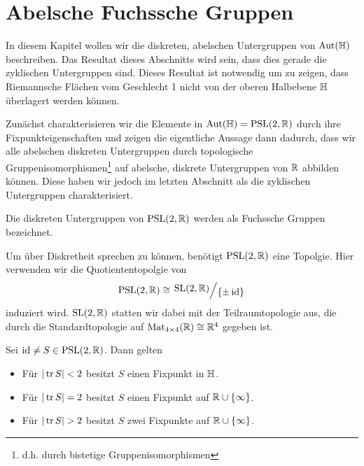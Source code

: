 
\section{Abelsche Fuchssche Gruppen}
\label{sec:fuchs}

In diesem Kapitel wollen wir die diskreten, abelschen Untergruppen von
$\operatorname{Aut}(\mathbb{H})$ beschreiben. Das Resultat dieses Abschnitts wird sein, dass
dies gerade die zyklischen Untergruppen sind. Dieses Resultat ist
notwendig um zu zeigen, dass Riemannsche Flächen vom Geschlecht 1
nicht von der oberen Halbebene $\mathbb{H}$ überlagert werden können.

Zunächst charakterisieren wir die Elemente in $\operatorname{Aut}(\mathbb{H}) = \operatorname{PSL}(2, \mathbb{R})$
durch ihre Fixpunkteigenschaften und zeigen die eigentliche Aussage
dann dadurch, dass wir alle abelschen diskreten Untergruppen durch
topologische Gruppenisomorphismen\footnote{d.h. durch bistetige
  Gruppenisomorphismen} auf abelsche, diskrete Untergruppen
von $\mathbb{R}$ abbilden können. Diese haben wir jedoch im letzten Abschnitt
als die zyklischen Untergruppen charakterisiert.

\begin{defin}
  Die diskreten Untergruppen von $\operatorname{PSL}(2,\mathbb{R})$ werden als Fuchssche
  Gruppen bezeichnet.
\end{defin}

\begin{rem}
  Um über Diskretheit sprechen zu können, benötigt $\operatorname{PSL}(2, \mathbb{R})$
  eine Topolgie. Hier verwenden wir die Quotiententopolgie von
  \[
  \PSL(2, \R) \cong \quot{\SL(2, \R)}{\{\pm \id\}}
  \]
  induziert wird. $\operatorname{SL}(2, \mathbb{R})$ statten wir dabei mit der
  Teilraumtopologie aus, die durch die Standardtopologie auf
  $\operatorname{Mat}_{4\times4}(\mathbb{R}) \cong \mathbb{R}^4$ gegeben ist.
\end{rem}

\begin{thm}
  \label{thm:fixpkt}
  Sei $\operatorname{id} \neq S \in \operatorname{PSL}(2, \mathbb{R})$. Dann gelten
  \begin{itemize}
  \item Für $|\operatorname{tr} S| < 2$ besitzt $S$ einen Fixpunkt in $\mathbb{H}$.
  \item Für $|\operatorname{tr} S| = 2$ besitzt $S$ einen Fixpunkt auf $\mathbb{R} \cup \{\infty\}$.
  \item Für $|\operatorname{tr} S| > 2$ besitzt $S$ zwei Fixpunkte auf $\mathbb{R} \cup \{\infty\}$.
  \end{itemize}
\end{thm}

